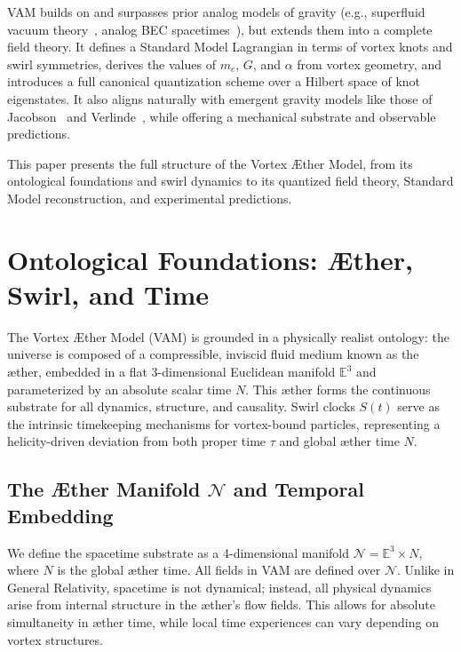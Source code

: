 \documentclass[preprint]{revtex4-2}
\begin{document}
    VAM builds on and surpasses prior analog models of gravity (e.g., superfluid vacuum theory~\cite{barcelo2011analogue}, analog BEC spacetimes~\cite{volovik2003universe}), but extends them into a complete field theory. It defines a Standard Model Lagrangian in terms of vortex knots and swirl symmetries, derives the values of $m_e$, $G$, and $\alpha$ from vortex geometry, and introduces a full canonical quantization scheme over a Hilbert space of knot eigenstates. It also aligns naturally with emergent gravity models like those of Jacobson~\cite{jacobson1995thermo} and Verlinde~\cite{verlinde2011emergent}, while offering a mechanical substrate and observable predictions.

    This paper presents the full structure of the Vortex \AE ther Model, from its ontological foundations and swirl dynamics to its quantized field theory, Standard Model reconstruction, and experimental predictions.

\section{Ontological Foundations: Æther, Swirl, and Time}\label{sec:ontological-foundations:-ther-swirl-and-time}
    The Vortex \AE ther Model (VAM) is grounded in a physically realist ontology: the universe is composed of a compressible, inviscid fluid medium known as the \ae ther, embedded in a flat 3-dimensional Euclidean manifold $\mathbb{E}^3$ and parameterized by an absolute scalar time $N$. This æther forms the continuous substrate for all dynamics, structure, and causality. Swirl clocks $S(t)$ serve as the intrinsic timekeeping mechanisms for vortex-bound particles, representing a helicity-driven deviation from both proper time $\tau$ and global æther time $N$.

    \subsection{The Æther Manifold $\mathcal{N}$ and Temporal Embedding}
    We define the spacetime substrate as a 4-dimensional manifold $\mathcal{N} = \mathbb{E}^3 \times N$, where $N$ is the global æther time. All fields in VAM are defined over $\mathcal{N}$. Unlike in General Relativity, spacetime is not dynamical; instead, all physical dynamics arise from internal structure in the æther's flow fields. This allows for absolute simultaneity in æther time, while local time experiences can vary depending on vortex structures.
\end{document}
